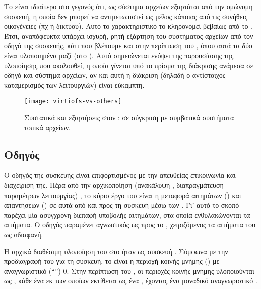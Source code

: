 Το \viofs{} είναι ιδιαίτερο στο γεγονός ότι, ως σύστημα αρχείων εξαρτάται από
την ομώνυμη συσκευή, η οποία δεν μπορεί να αντιμετωπιστεί ως μέλος κάποιας από
τις συνήθεις οικογένειες (πχ  ή δικτύου). Αυτό το χαρακτηριστικό το
κληρονομεί βεβαίως από το . Έτσι, αναπόφευκτα υπάρχει ισχυρή, ρητή
εξάρτηση του \viofs{} συστήματος αρχείων από τον οδηγό της \viofs{} συσκευής,
κάτι που βλέπουμε και στην περίπτωση του \linux{}, όπου αυτά τα δύο είναι
υλοποιημένα μαζί (στο ). Αυτό σημειώνεται ενόψει της
παρουσίασης της υλοποίησης που ακολουθεί, η οποία γίνεται υπό το πρίσμα της
διάκρισης ανάμεσα σε οδηγό και σύστημα αρχείων, αν και αυτή η διάκριση (δηλαδή
ο αντίστοιχος καταμερισμός των λειτουργιών) είναι εύκαμπτη.

\begin{figure}
    \centering
    \texttt{[image: virtiofs-vs-others]}
    \caption{Συστατικά και εξαρτήσεις στον \guest{}: \viofs{} σε σύγκριση με
        συμβατικά συστήματα τοπικά αρχείων.}
    \label{fig:virtiofs-vs-others}
\end{figure}

\subsection{Οδηγός}

Ο οδηγός της \viofs{} συσκευής είναι επιφορτισμένος με την απευθείας επικοινωνία
και διαχείριση της. Πέρα από την αρχικοποίηση (ανακάλυψη ,
διαπραγμάτευση παραμέτρων λειτουργίας) \cite{virtio}, το κύριο έργο του είναι η
μεταφορά αιτημάτων () και απαντήσεων () σε αυτά από
και προς τη συσκευή μέσω των . Γι' αυτό το σκοπό παρέχει μία
ασύγχρονη διεπαφή υποβολής αιτημάτων, στα οποία ενθυλακώνονται τα 
αιτήματα. Ο οδηγός παραμένει αγνωστικός ως προς το , χειριζόμενος τα
αιτήματα του ως αδιαφανή.

Η αρχικά διαθέσιμη υλοποίηση του \viofs{}  στο \qemu{} ήταν ως
συσκευή . Σύμφωνα με την προδιαγραφή του  \cite{virtio}
για τη συσκευή, το  είναι η περιοχή κοινής μνήμης () με αναγνωριστικό (``'') 0. Στην περίπτωση του
, οι περιοχές κοινής μνήμης υλοποιούνται ως
, κάθε ένα εκ των οποίων εκτίθεται ως ένα
, έχοντας ένα μοναδικό
αναγνωριστικό \cite{virtio} \cite{wiki:pci-conf} \cite{osdev:pci}.

